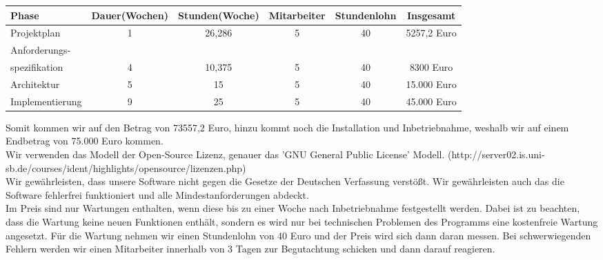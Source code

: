 \documentclass[fontsize=12pt,paper=a4,twoside]{scrartcl}
\begin{document}
\newpage
\begin{table}[htbp]
\begin{tabular}{|p{3cm}|c|c|c|c|c|}
\hline 
Phase & Dauer(Wochen) & Stunden(Woche) & Mitarbeiter & Stundenlohn & Insgesamt \\ \hline
Projektplan & 1 & 26,286 & 5 & 40 & 5257,2 Euro\\ \hline
Anforderungs- & & & & & \\ 
spezifikation & 4 & 10,375 & 5 & 40 & 8300 Euro\\ \hline
Architektur & 5 & 15 & 5 & 40 & 15.000 Euro\\ \hline
Implementierung & 9 & 25 & 5 & 40 & 45.000 Euro\\ \hline
\end{tabular}
\end{table}
Somit kommen wir auf den Betrag von 73557,2 Euro, hinzu kommt noch die Installation und Inbetriebnahme, weshalb wir auf einem Endbetrag von 75.000 Euro kommen.\\
Wir verwenden das Modell der Open-Source Lizenz, genauer das 'GNU General Public License' Modell. (http://server02.is.uni-sb.de/courses/ident/highlights/opensource/lizenzen.php)\\
Wir gewährleisten, dass unsere Software nicht gegen die Gesetze der Deutschen Verfassung verstößt. Wir gewährleisten auch das die Software fehlerfrei funktioniert und alle Mindestanforderungen abdeckt.\\
Im Preis sind nur Wartungen enthalten, wenn diese bis zu einer Woche nach Inbetriebnahme festgestellt werden. Dabei ist zu beachten, dass die Wartung keine neuen Funktionen enthält, sondern es wird nur bei technischen Problemen des Programms eine kostenfreie Wartung angesetzt. Für die Wartung nehmen wir einen Stundenlohn von 40 Euro und der Preis wird sich dann daran messen. Bei schwerwiegenden Fehlern werden wir einen Mitarbeiter innerhalb von 3 Tagen zur Begutachtung schicken und dann darauf reagieren. 
\end{document}
